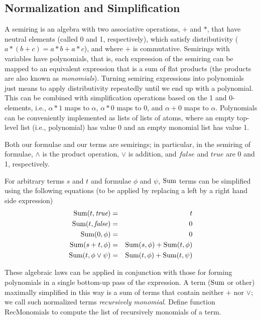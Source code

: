 \subsection{Normalization and Simplification}


A semiring is an algebra with two associative operations,
$+$ and $*$, that
have neutral elements (called 0 and 1, respectively), which satisfy
distributivity ($a*(b+c)= a*b + a*c$), and where $+$ is commutative.
Semirings with variables
have polynomials, that is, each expression of the
semiring can be mapped to an equivalent expression that is
a sum of flat products (the products are also known as {\em monomials}\/).
Turning semiring expressions into polynomials just means to apply
distributivity repeatedly until we end up with a polynomial.
This can be combined with simplification operations based on the 1 and
0-elements, i.e., $\alpha * 1$ maps to $\alpha$, $\alpha*0$ maps to $0$, and
$\alpha+0$ maps to $\alpha$. Polynomials can be conveniently implemented
as lists of lists of atoms, where an empty top-level list (i.e., polynomial)
has value 0 and an empty monomial list has value 1.

Both our formulae and our terms are semirings; in particular,
in the semiring of formulae, $\land$ is the product operation,
$\lor$ is addition,
and $\textit{false}$ and $\textit{true}$ are 0 and 1, respectively.

For arbitrary terms $s$ and $t$ and formulae $\phi$ and $\psi$,
$\mbox{Sum}$ terms can be simplified using the following equations (to be
applied by replacing a left by a right hand side expression)
\begin{eqnarray*}
\mbox{Sum}(t, \textit{true}) &=& t \\
\mbox{Sum}(t, \textit{false}) &=& 0 \\
\mbox{Sum}(0, \phi) &=& 0 \\
\mbox{Sum}(s+t, \phi) &=& \mbox{Sum}(s, \phi) + \mbox{Sum}(t, \phi) \\
\mbox{Sum}(t, \phi \lor \psi) &=& \mbox{Sum}(t, \phi) + \mbox{Sum}(t, \psi)
\end{eqnarray*}

These algebraic laws can be applied in conjunction with those for forming
polynomials in a single bottom-up pass of the expression.
A term ($\mbox{Sum}$ or other) maximally simplified in this way
is a sum of terms that contain neither $+$ nor $\lor$; we call such 
normalized terms {\em recursively monomial}.
Define function RecMonomials to compute the list of recursively monomials
of a term.

